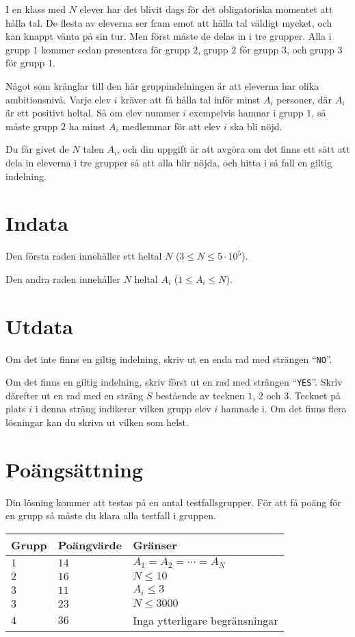 

I en klass med $N$ elever har det blivit dags för det obligatoriska momentet att hålla tal. 
De flesta av eleverna ser fram emot att hålla tal väldigt mycket, och kan knappt vänta på sin tur.
Men först måste de delas in i tre grupper. Alla i grupp $1$ kommer sedan presentera för grupp $2$, 
grupp $2$ för grupp $3$, och grupp $3$ för grupp $1$. 

Något som krånglar till den här gruppindelningen är att eleverna har olika ambitionsnivå. Varje elev $i$
kräver att få hålla tal inför minst $A_i$ personer, där $A_i$ är ett positivt heltal. Så om elev
nummer $i$ exempelvis hamnar i grupp $1$, så måste grupp $2$ ha minst $A_i$ medlemmar för att elev 
$i$ ska bli nöjd.

Du får givet de $N$ talen $A_i$, och din uppgift är att avgöra om det finns ett sätt att dela in eleverna
i tre grupper så att alla blir nöjda, och hitta i så fall en giltig indelning.


\section*{Indata}
Den första raden innehåller ett heltal $N$ ($3 \leq N \leq 5 \cdot 10^5$).

Den andra raden innehåller $N$ heltal $A_i$ ($1 \leq A_i \leq N$).

\section*{Utdata}

Om det inte finns en giltig indelning, skriv ut en enda rad med strängen ``\texttt{NO}''.

Om det finns en giltig indelning, skriv först ut en rad med strängen ``\texttt{YES}''. 
Skriv därefter ut en rad med en sträng $S$ bestående av tecknen $1$, $2$ och $3$. Tecknet på
plats $i$ i denna sträng indikerar vilken grupp elev $i$ hamnade i. Om det finns flera lösningar
kan du skriva ut vilken som helst.

\section*{Poängsättning}
Din lösning kommer att testas på en antal testfallsgrupper.
För att få poäng för en grupp så måste du klara alla testfall i gruppen.

\noindent
\begin{tabular}{| l | l | p{12cm} |}
  \hline
  Grupp & Poängvärde & Gränser \\ \hline
  $1$   & $14$       & $A_1 = A_2 = \cdots = A_N$\\ \hline
  $2$   & $16$       & $N \leq 10$  \\ \hline
  $3$   & $11$       & $A_i \leq 3$ \\ \hline
  $3$   & $23$       & $N \leq 3000$ \\ \hline
  $4$   & $36$       & Inga ytterligare begränsningar \\ \hline
\end{tabular}
